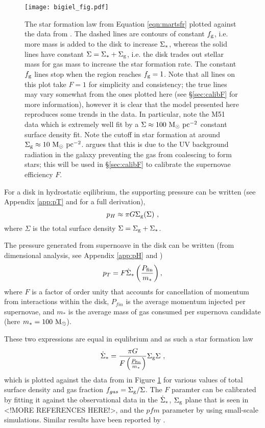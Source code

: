 \begin{figure}
    \centering
    \texttt{[image: bigiel\_fig.pdf]}
    \caption{The star formation law from Equation \ref{eqn:martsfr} plotted against the data from \citet{bigiel_star_2008}. The dashed lines are contours of constant $f_\mathrm{g}$, i.e. more mass is added to the disk to increase $\Sigma_*$, whereas the solid lines have constant $\Sigma = \Sigma_* + \Sigma_\mathrm{g}$, i.e. the disk trades out stellar mass for gas mass to increase the star formation rate. The constant $f_\mathrm{g}$ lines stop when the region reaches $f_\mathrm{g}=1$. Note that all lines on this plot take $F=1$ for simplicity and consistency; the true lines may vary somewhat from the ones plotted here (see \S \ref{sec:calibF} for more information), however it is clear that the model presented here reproduces some trends in the data. In particular, note the M51 data which is extremely well fit by a $\Sigma \approx 100 ~\mathrm{M}_{\odot} ~\mathrm{pc}^{-2}$ constant surface density fit. Note the cutoff in star formation at around $\Sigma_\mathrm{g} \approx 10 ~\mathrm{M}_{\odot} ~\mathrm{pc}^{-2}$. \citet{schaye_star_2004} argues that this is due to the UV background radiation in the galaxy preventing the gas from coalescing to form stars; this will be used in \S \ref{sec:calibF} to calibrate the supernovae efficiency $F$.}
    \label{fig:bigielwithmart}
\end{figure}

For a disk in hydrostatic eqilibrium, the supporting pressure can be written (see Appendix \ref{app:pT} and \citet{ostriker_maximally_2011} for a full derivation),
\begin{equation}
\label{eqn:hydeq}
p_H \approx \pi G \Sigma_\mathrm{g} (\Sigma)~,
\end{equation}
where $\Sigma$ is the total surface density $\Sigma = \Sigma_\mathrm{g} + \Sigma_*$.

The pressure generated from supernoave in the disk can be written (from dimensional analysis, see Appendix \ref{app:pH} and \citet{martizzi_supernova_2015})
\begin{equation}
\label{eqn:turb}
p_T = F \dot{\Sigma}_* \left(\frac{P_\mathrm{fin}}{m_*}\right),
\end{equation}
where $F$ is a factor of order unity that accounts for cancellation of momentum from interactions within the disk, $P_{fin}$ is the average momentum injected per supernovae, and $m_*$ is the average mass of gas consumed per supernova candidate (here $m_* = 100 ~\mathrm{M}_{\odot}$).

These two expressions are equal in equlibrium and as such a star formation law
\begin{equation}
\label{eqn:martsfr}
\dot{\Sigma}_* = \frac{\pi G}{F \left(\frac{P_\mathrm{fin}}{m_*}\right)} \Sigma_\mathrm{g} \Sigma~,
\end{equation}
which is plotted against the data from \citet{bigiel_star_2008} in Figure \ref{fig:bigielwithmart} for various values of total surface density and gas fraction $f_{gas} = \Sigma_\mathrm{g}/\Sigma$.
The $F$ paramter can be calibrated by fitting it against the observational data in the $\dot{\Sigma}_*$, $\Sigma_\mathrm{g}$ plane that is seen in \citet{bigiel_star_2008} <!MORE REFERENCES HERE!>, and the $pfm$ parameter by using small-scale simulations.
Similar results have been reported by \citep{ostriker_maximally_2011}.
